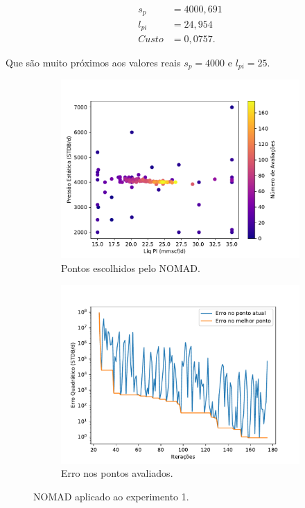 \begin{align*}
s_p&= 4000,691 \\
l_{pi} &= 24,954 \\
Custo &= 0,0757.
\end{align*}

Que são muito próximos aos valores reais $s_p=4000$ e $l_{pi}=25$.


\begin{figure}[H]
\centering
\begin{subfigure}{0.5\textwidth}
  \centering
  \includegraphics[width=1\linewidth]{figs/setup1_eval_points.pdf}
  \caption{Pontos escolhidos pelo NOMAD.}
  \label{fig:setup1_points}
\end{subfigure}%
\begin{subfigure}{0.5\textwidth}
  \centering
  \includegraphics[width=1\linewidth]{figs/setup1_errors.pdf}
  \caption{Erro nos pontos avaliados.}
  \label{fig:setup1_error}
\end{subfigure}
\caption{NOMAD aplicado ao experimento 1.}
\label{fig:setup1_2}
\end{figure}

